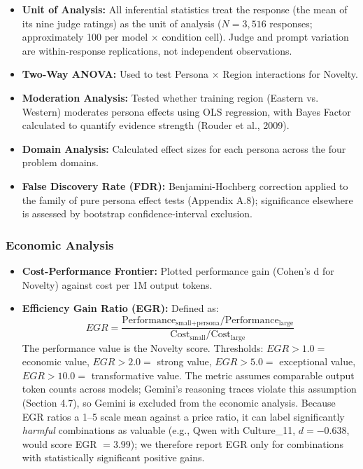\documentclass{article}
\begin{document}
\begin{itemize}
    \item \textbf{Unit of Analysis:} All inferential statistics treat the response (the mean of its nine judge ratings) as the unit of analysis ($N = 3{,}516$ responses; approximately 100 per model $\times$ condition cell). Judge and prompt variation are within-response replications, not independent observations.
    \item \textbf{Two-Way ANOVA:} Used to test Persona $\times$ Region interactions for Novelty.
    \item \textbf{Moderation Analysis:} Tested whether training region (Eastern vs. Western) moderates persona effects using OLS regression, with Bayes Factor calculated to quantify evidence strength (Rouder et al., 2009).
    \item \textbf{Domain Analysis:} Calculated effect sizes for each persona across the four problem domains.
    \item \textbf{False Discovery Rate (FDR):} Benjamini-Hochberg correction applied to the family of pure persona effect tests (Appendix A.8); significance elsewhere is assessed by bootstrap confidence-interval exclusion.
\end{itemize}

\subsubsection{Economic Analysis}

\begin{itemize}
    \item \textbf{Cost-Performance Frontier:} Plotted performance gain (Cohen's d for Novelty) against cost per 1M output tokens.
    \item \textbf{Efficiency Gain Ratio (EGR):} Defined as:
    \begin{equation}
    EGR = \frac{\text{Performance}_{\text{small+persona}} / \text{Performance}_{\text{large}}}{\text{Cost}_{\text{small}} / \text{Cost}_{\text{large}}}
    \end{equation}
    The performance value is the Novelty score.
    Thresholds: $EGR > 1.0 =$ economic value, $EGR > 2.0 =$ strong value, $EGR > 5.0 =$ exceptional value, $EGR > 10.0 =$ transformative value.
    The metric assumes comparable output token counts across models; Gemini's reasoning traces violate this assumption (Section 4.7), so Gemini is excluded from the economic analysis. Because EGR ratios a 1--5 scale mean against a price ratio, it can label significantly \emph{harmful} combinations as valuable (e.g., Qwen with Culture\_11, $d = -0.638$, would score EGR $= 3.99$); we therefore report EGR only for combinations with statistically significant positive gains.
\end{itemize}
\end{document}
